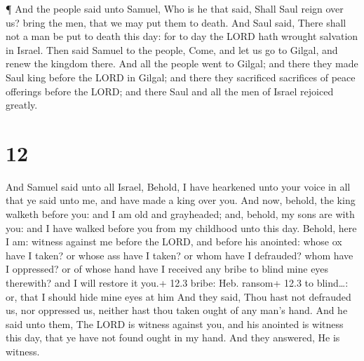  ¶ And the people said unto Samuel, Who is he that said,
Shall Saul reign over us? bring the men, that we may put them to death.
 And Saul said, There shall not a man be put to death this
day: for to day the LORD hath wrought salvation in Israel. 
Then said Samuel to the people, Come, and let us go to Gilgal, and renew
the kingdom there.  And all the people went to Gilgal; and
there they made Saul king before the LORD in Gilgal; and there they
sacrificed sacrifices of peace offerings before the LORD; and there Saul
and all the men of Israel rejoiced greatly.

\hypertarget{section-11}{%
\section{12}\label{section-11}}

 And Samuel said unto all Israel, Behold, I have hearkened
unto your voice in all that ye said unto me, and have made a king over
you.  And now, behold, the king walketh before you: and I am
old and grayheaded; and, behold, my sons are with you: and I have walked
before you from my childhood unto this day.  Behold, here I
am: witness against me before the LORD, and before his anointed: whose
ox have I taken? or whose ass have I taken? or whom have I defrauded?
whom have I oppressed? or of whose hand have I received any bribe to
blind mine eyes therewith? and I will restore it you.+ 12.3 bribe: Heb.
ransom+ 12.3 to blind\ldots: or, that I should hide mine eyes at him
 And they said, Thou hast not defrauded us, nor oppressed
us, neither hast thou taken ought of any man's hand.  And he
said unto them, The LORD is witness against you, and his anointed is
witness this day, that ye have not found ought in my hand. And they
answered, He is witness.

